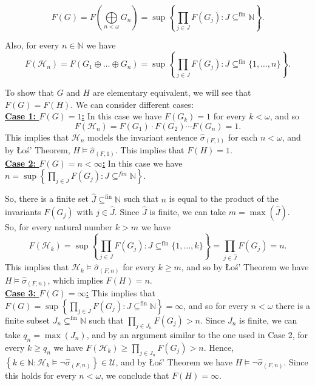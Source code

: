 \documentclass[10pt,a4paper]{amsart}
\theoremstyle{definition}
\newcommand{\Los}{\L o\'s}
\begin{document}
\[F(G) = F\left( \bigoplus\limits_{n<\omega} G_{n}\right) = \sup\left\{\prod\limits_{j\in J} F(G_{j}) : J\subseteq^{\text{fin}} \mathbb{N}\right\}.\]

Also, for every $n\in\mathbb{N}$ we have
\[F(\mathcal{H}_{n}) = F (G_{1}\oplus \dots \oplus G_{n}) = \sup\left\{\prod\limits_{j\in J} F(G_{j}) : J\subseteq^{\text{fin}} \{1,\dots,n\}\right\}.\]

To show that $G$ and $H$ are elementary equivalent, we will see that $F(G) = F(H)$. We can consider different cases:\\

\underline{\textbf{Case 1: $F(G)=1$:}} In this case we have $F(G_{k})=1$ for every $k<\omega$, and so \[F(\mathcal{H}_n)=F(G_1)\cdot F(G_2)\cdots F(G_n)=1.\] This implies that $\mathcal{H}_{n}$ models the invariant sentence $\hat{\sigma}_{(F,1)}$ for each $n<\omega$, and by \Los' Theorem, $H\models\hat{\sigma}_{(F,1)}$. This implies that $F(H)=1$.\\

\underline{\textbf{Case 2: $F(G)=n<\infty$:}} In this case we have $\displaystyle{n=\sup\left\{\prod\limits_{j\in J} F(G_{j}) : J\subseteq^{fin} \mathbb{N}\right\}.}$

So, there is a finite set $\hat{J}\subseteq^{\text{fin}}\mathbb{N}$ such that $n$ is equal to the product of the invariants $F(G_j)$ with $j\in \widehat{J}$. Since $\hat{J}$ is finite, we can take $m=\max(\hat{J})$.\\

So, for every natural number $k>m$ we have 
\[F(\mathcal{H}_{k}) = \sup\left\{\prod\limits_{j\in J} F(G_{j}) : J\subseteq^{\text{fin}} \{1,\dots,k\}\right\} = \prod\limits_{j\in\hat{J}} F(G_{j}) = n.\]
This implies that $\mathcal{H}_{k}\models\hat{\sigma}_{(F,n)}$ for every $k\geq m$, and so by \Los' Theorem we have $H\models\hat{\sigma}_{(F,n)}$, which implies $F(H)=n$.\\

\underline{\textbf{Case 3: $F(G)=\infty$:}} This implies that $F(G) = \sup\left\{\prod\limits_{j\in J} F(G_{j}) : J\subseteq^{\text{fin}} \mathbb{N}\right\}=\infty$, and so for every $n<\omega$ there is a finite subset $J_n\subseteq^{\text{fin}}\mathbb{N}$ such that $\prod\limits_{j\in J_{n}} F(G_{j})>n$. Since $J_{n}$ is finite, we can take $q_{n}=\max(J_{n})$, and by an argument similar to the one used in Case 2, for every $k\geq q_{n}$ we have $\displaystyle{F(\mathcal{H}_{k}) \geq \prod\limits_{j\in J_{n}} F(G_{j}) >n}$. Hence, $\left\{k\in\mathbb{N}: \mathcal{H}_{k}\models\neg\hat{\sigma}_{(F,n)}\right\} \in \mathcal{U}$, and by \Los' Theorem we have $H\models\neg\hat{\sigma}_{(F,n)}$. Since this holds for every $n<\omega$, we conclude that $F(H)=\infty$.\\
\end{document}
